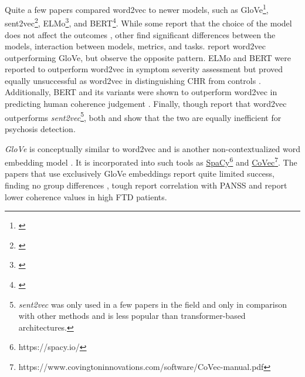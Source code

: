 Quite a few papers compared word2vec to newer models, such as 
GloVe\footnote{\cite{iter2018automatic, just2019coherence, tang2022clinical, tang2023latent, just2023validation}}, 
sent2vec\footnote{\cite{iter2018automatic, just2019coherence, hitczenko2021understanding}}, 
ELMo\footnote{\cite{ryazanskaya2020thesis, hitczenko2021understanding, sarzynska2021detecting}}, 
and BERT\footnote{\cite{ryazanskaya2020thesis, hitczenko2021understanding, xu2022fully}}. While some report that the choice of the model does not affect the outcomes \citep{hitczenko2021understanding, fradkin2023theory}, other find significant differences between the models, interaction between models, metrics, and tasks.  \citet{iter2018automatic, just2023validation} report word2vec outperforming GloVe, but \citet{just2019coherence} observe the opposite pattern. ELMo and BERT were reported to outperform word2vec in symptom severity assessment \citep{ryazanskaya2020thesis} but proved equally unsuccessful as word2vec in distinguishing CHR from controls \citep{hitczenko2021understanding}. Additionally, BERT and its variants were shown to outperform word2vec in predicting human coherence judgement \citep{xu2022fully}. Finally, though \citet{iter2018automatic} report that word2vec outperforms \textit{sent2vec}\footnote{\textit{sent2vec} \citep{moghadasi2020sent2vec} was only used in a few papers in the field and only in comparison with other methods and is less popular than transformer-based architectures.}, both \citet{just2019coherence} and \citet{hitczenko2021understanding} show that the two are equally inefficient for psychosis detection.


\textit{GloVe} is conceptually similar to word2vec and is another non-contextualized word embedding model \citep{pennington2014glove}. It is incorporated into such tools as \href{https://spacy.io/}{SpaCy}\footnote{https://spacy.io/} and \href{https://www.covingtoninnovations.com/software/CoVec-manual.pdf}{CoVec}\footnote{https://www.covingtoninnovations.com/software/CoVec-manual.pdf}. The papers that use exclusively GloVe embeddings report quite limited success, finding no group differences \citep{just2020modeling, alonso2022language, alonso2022progressive}, tough \citet{alonso2022progressive} report correlation with PANSS and \citet{just2020modeling} report lower coherence values in high FTD patients.

